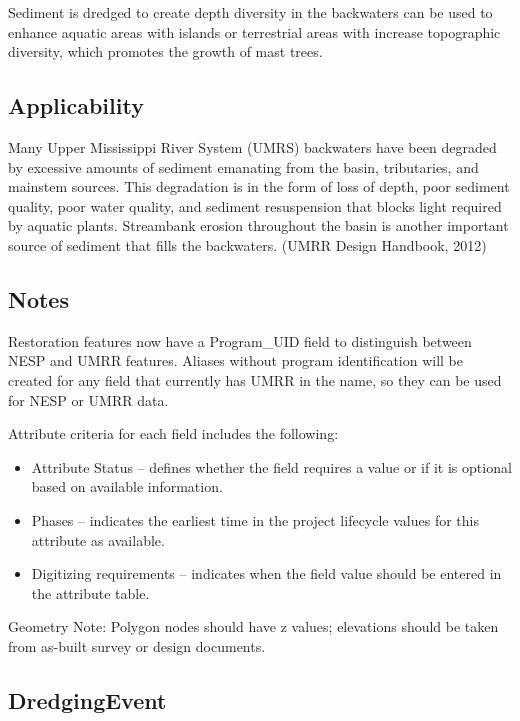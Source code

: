 \documentclass[
  letterpaper,
  DIV=11,
  numbers=noendperiod]{scrreprt}
\providecommand{\tightlist}{%
  \setlength{\itemsep}{0pt}\setlength{\parskip}{0pt}}
\begin{document}
Sediment is dredged to create depth diversity in the backwaters can be
used to enhance aquatic areas with islands or terrestrial areas with
increase topographic diversity, which promotes the growth of mast trees.

\subsection{Applicability}\label{applicability}

Many Upper Mississippi River System (UMRS) backwaters have been degraded
by excessive amounts of sediment emanating from the basin, tributaries,
and mainstem sources. This degradation is in the form of loss of depth,
poor sediment quality, poor water quality, and sediment resuspension
that blocks light required by aquatic plants. Streambank erosion
throughout the basin is another important source of sediment that fills
the backwaters. (UMRR Design Handbook, 2012)

\subsection{Notes}\label{notes-2}

Restoration features now have a Program\_UID field to distinguish
between NESP and UMRR features. Aliases without program identification
will be created for any field that currently has UMRR in the name, so
they can be used for NESP or UMRR data.

Attribute criteria for each field includes the following:

\begin{itemize}
\tightlist
\item
  Attribute Status -- defines whether the field requires a value or if
  it is optional based on available information.
\item
  Phases -- indicates the earliest time in the project lifecycle values
  for this attribute as available.
\item
  Digitizing requirements -- indicates when the field value should be
  entered in the attribute table.
\end{itemize}

Geometry Note: Polygon nodes should have z values; elevations should be
taken from as-built survey or design documents.

\subsection{DredgingEvent}\label{dredgingevent}
\end{document}
